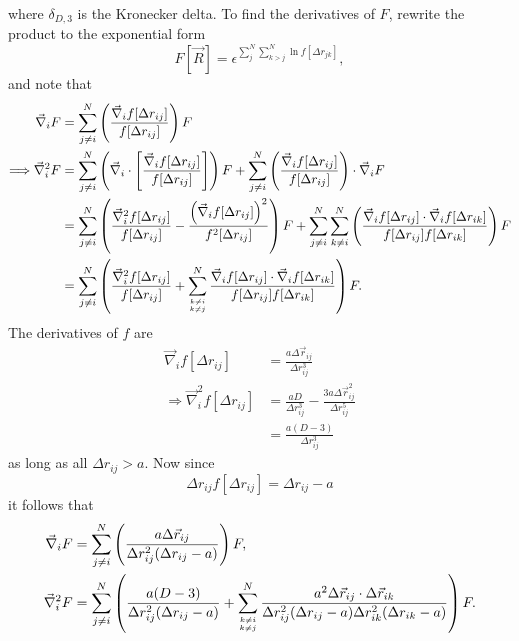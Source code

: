 \documentclass[a4paper,8pt]{article}
\begin{document}
where $\delta_{D,3}$ is the Kronecker delta. To find the derivatives of $F$, rewrite the product to the exponential form 
\begin{equation}
F[\vec{R}] = \epsilon^{\sum\limits_{j}^N\sum\limits_{k > j}^N \ln f[\Delta{r}_{jk}]},
\end{equation}
and note that
\begin{align}
\vec{\nabla}_i F &= \sum\limits_{j \neq i}^N \left(\frac{\vec{\nabla}_i f[\Delta{r}_{ij}]}{f[\Delta{r}_{ij}]}\right) F \\
\Longrightarrow \vec{\nabla}_i^2 F &= \sum\limits_{j \neq i}^N \left(\vec{\nabla}_i\cdot\left[\frac{\vec{\nabla}_i f[\Delta{r}_{ij}]}{f[\Delta{r}_{ij}]}\right]\right) F + \sum\limits_{j \neq i}^N \left(\frac{\vec{\nabla}_i f[\Delta{r}_{ij}]}{f[\Delta{r}_{ij}]}\right)\cdot \vec{\nabla}_i F \nonumber\\
&= \sum\limits_{j \neq i}^N \left(\frac{\vec{\nabla}_i^2 f[\Delta{r}_{ij}]}{f[\Delta{r}_{ij}]} - \frac{\left(\vec{\nabla}_i f[\Delta{r}_{ij}]\right)^2}{f^2[\Delta{r}_{ij}]}\right) F + \sum\limits_{j \neq i}^N \sum\limits_{k \neq i}^N \left(\frac{\vec{\nabla}_i f[\Delta{r}_{ij}] \cdot\vec{\nabla}_i f[\Delta{r}_{ik}]}{f[\Delta{r}_{ij}]f[\Delta{r}_{ik}]}\right) F \nonumber\\
&= \sum\limits_{j \neq i}^N \left(\frac{\vec{\nabla}_i^2 f[\Delta{r}_{ij}]}{f[\Delta{r}_{ij}]} + \sum\limits_{{k \neq i}\atop{k \neq j}}^N \frac{\vec{\nabla}_i f[\Delta{r}_{ij}] \cdot\vec{\nabla}_i f[\Delta{r}_{ik}]}{f[\Delta{r}_{ij}]f[\Delta{r}_{ik}]}\right) F.
\end{align}
The derivatives of $f$ are
\begin{align}
\vec{\nabla}_i f[\Delta{r}_{ij}] &= \frac{a\Delta\vec{r}_{ij}}{\Delta{r}_{ij}^3} \\
\Longrightarrow \vec{\nabla}_i^2 f[\Delta{r}_{ij}] &= \frac{aD}{\Delta{r}_{ij}^3}-\frac{3a\Delta\vec{r}_{ij}^2}{\Delta{r}_{ij}^5} \nonumber\\
&= \frac{a(D-3)}{\Delta{r}_{ij}^3}
\end{align}
as long as all $\Delta{r}_{ij} > a$. Now since
\begin{equation}
\Delta{r}_{ij} f[\Delta{r}_{ij}] = \Delta{r}_{ij}-a
\end{equation}
it follows that
\begin{align}
\vec{\nabla}_i F &= \sum\limits_{j \neq i}^N \left(\frac{a\Delta\vec{r}_{ij}}{\Delta{r}_{ij}^2(\Delta{r}_{ij}-a)}\right) F, \label{grad_F}\\
\vec{\nabla}_i^2 F &= \sum\limits_{j \neq i}^N \left(\frac{a(D-3)}{\Delta{r}_{ij}^2(\Delta{r}_{ij}-a)} + \sum\limits_{{k \neq i}\atop{k \neq j}}^N \frac{a^2 \Delta\vec{r}_{ij} \cdot \Delta\vec{r}_{ik}}{\Delta{r}_{ij}^2(\Delta{r}_{ij}-a) \Delta{r}_{ik}^2(\Delta{r}_{ik}-a)}\right) F. \label{Lap_F}
\end{align}
\end{document}
